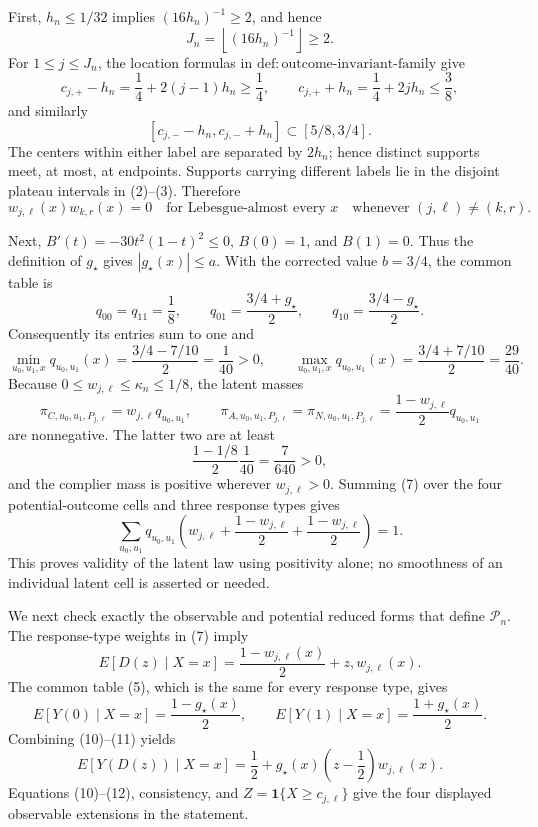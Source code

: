 First, \(h_n\le1/32\) implies \((16h_n)^{-1}\ge2\), and hence
\[
 J_n=\left\lfloor(16h_n)^{-1}\right\rfloor\ge2.
 \tag{1}
\]
For \(1\le j\le J_n\), the location formulas in \(\mathrm{def:outcome\mbox{-}invariant\mbox{-}family}\) give
\[
 c_{j,+}-h_n=\frac14+2(j-1)h_n\ge\frac14,
 \qquad
 c_{j,+}+h_n=\frac14+2jh_n\le\frac38,
 \tag{2}
\]
and similarly
\[
 [c_{j,-}-h_n,c_{j,-}+h_n]\subset[5/8,3/4].
 \tag{3}
\]
The centers within either label are separated by \(2h_n\); hence distinct supports meet, at most, at endpoints.  Supports carrying different labels lie in the disjoint plateau intervals in (2)--(3).  Therefore
\[
 w_{j,\ell}(x)w_{k,r}(x)=0
 \quad\text{for Lebesgue-almost every }x
 \quad\text{whenever }(j,\ell)\ne(k,r).
 \tag{4}
\]

Next, \(B'(t)=-30t^2(1-t)^2\le0\), \(B(0)=1\), and \(B(1)=0\).  Thus the definition of \(g_\star\) gives \(|g_\star(x)|\le a\).  With the corrected value \(b=3/4\), the common table is
\[
 q_{00}=q_{11}=\frac18,
 \qquad
 q_{01}=\frac{3/4+g_\star}{2},
 \qquad
 q_{10}=\frac{3/4-g_\star}{2}.
 \tag{5}
\]
Consequently its entries sum to one and
\[
 \min_{u_0,u_1,x}q_{u_0,u_1}(x)
 =\frac{3/4-7/10}{2}=\frac1{40}>0,
 \qquad
 \max_{u_0,u_1,x}q_{u_0,u_1}(x)
 =\frac{3/4+7/10}{2}=\frac{29}{40}.
 \tag{6}
\]
Because \(0\le w_{j,\ell}\le\kappa_n\le1/8\), the latent masses
\[
 \pi_{C,u_0,u_1,P_{j,\ell}}=w_{j,\ell}q_{u_0,u_1},
 \qquad
 \pi_{A,u_0,u_1,P_{j,\ell}}
 =\pi_{N,u_0,u_1,P_{j,\ell}}
 =\frac{1-w_{j,\ell}}2q_{u_0,u_1}
 \tag{7}
\]
are nonnegative.  The latter two are at least
\[
 \frac{1-1/8}{2}\frac1{40}=\frac7{640}>0,
 \tag{8}
\]
and the complier mass is positive wherever \(w_{j,\ell}>0\).  Summing (7) over the four potential-outcome cells and three response types gives
\[
 \sum_{u_0,u_1}q_{u_0,u_1}
 \left(w_{j,\ell}+\frac{1-w_{j,\ell}}2+
                    \frac{1-w_{j,\ell}}2\right)=1.
 \tag{9}
\]
This proves validity of the latent law using positivity alone; no smoothness of an individual latent cell is asserted or needed.

We next check exactly the observable and potential reduced forms that define \(\mathcal P_n\).  The response-type weights in (7) imply
\[
 E[D(z)\mid X=x]=\frac{1-w_{j,\ell}(x)}2+z,w_{j,\ell}(x).
 \tag{10}
\]
The common table (5), which is the same for every response type, gives
\[
 E[Y(0)\mid X=x]=\frac{1-g_\star(x)}2,
 \qquad
 E[Y(1)\mid X=x]=\frac{1+g_\star(x)}2.
 \tag{11}
\]
Combining (10)--(11) yields
\[
 E[Y(D(z))\mid X=x]
 =\frac12+g_\star(x)\left(z-\frac12\right)w_{j,\ell}(x).
 \tag{12}
\]
Equations (10)--(12), consistency, and \(Z=\mathbf 1\{X\ge c_{j,\ell}\}\) give the four displayed observable extensions in the statement.

